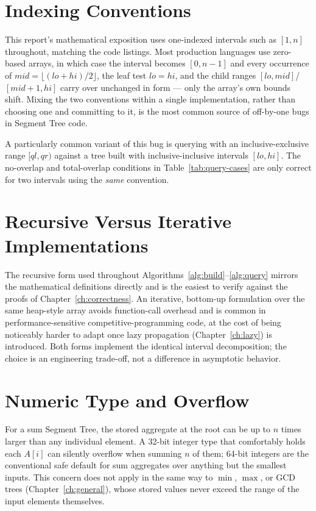 \section{Indexing Conventions}
\label{sec:indexing}
This report's mathematical exposition uses one-indexed intervals such as $[1,n]$ throughout, matching the code listings. Most production languages use zero-based arrays, in which case the interval becomes $[0,n-1]$ and every occurrence of $mid=\lfloor(lo+hi)/2\rfloor$, the leaf test $lo=hi$, and the child ranges $[lo,mid]$/$[mid+1,hi]$ carry over unchanged in form --- only the array's own bounds shift. Mixing the two conventions within a single implementation, rather than choosing one and committing to it, is the most common source of off-by-one bugs in Segment Tree code.

\begin{pitfall}
A particularly common variant of this bug is querying with an inclusive-exclusive range $[ql,qr)$ against a tree built with inclusive-inclusive intervals $[lo,hi]$. The no-overlap and total-overlap conditions in Table~\ref{tab:query-cases} are only correct for two intervals using the \emph{same} convention.
\end{pitfall}

\section{Recursive Versus Iterative Implementations}
The recursive form used throughout Algorithms~\ref{alg:build}--\ref{alg:query} mirrors the mathematical definitions directly and is the easiest to verify against the proofs of Chapter~\ref{ch:correctness}. An iterative, bottom-up formulation over the same heap-style array avoids function-call overhead and is common in performance-sensitive competitive-programming code, at the cost of being noticeably harder to adapt once lazy propagation (Chapter~\ref{ch:lazy}) is introduced. Both forms implement the identical interval decomposition; the choice is an engineering trade-off, not a difference in asymptotic behavior.

\section{Numeric Type and Overflow}
For a sum Segment Tree, the stored aggregate at the root can be up to $n$ times larger than any individual element. A 32-bit integer type that comfortably holds each $A[i]$ can silently overflow when summing $n$ of them; 64-bit integers are the conventional safe default for sum aggregates over anything but the smallest inputs. This concern does not apply in the same way to $\min$, $\max$, or GCD trees (Chapter~\ref{ch:general}), whose stored values never exceed the range of the input elements themselves.

